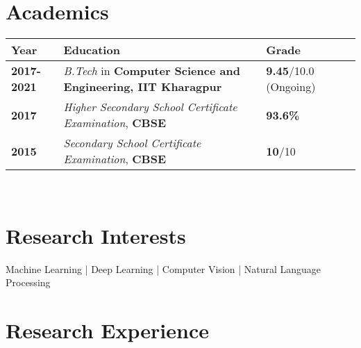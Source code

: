 \documentclass[a4paper,10pt]{extarticle} %
\begin{document}
\vspace{-0.6cm}
\section{\textcolor{primary}{Academics}}

\indent \begin{tabular}{ l @{\hskip 1cm} l @{\hskip 2.5cm} l @{\hskip 1.8cm} l }
\textbf{Year} & \textbf{Education} & \textbf{Grade}\\
\hline
\textbf{2017-2021} & \textit{B.Tech} in \textbf{Computer Science and Engineering, IIT Kharagpur} & \textbf{9.45}/10.0 (Ongoing) \\
\textbf{2017} & \textit{Higher Secondary School Certificate Examination}, \textbf{CBSE} & \textbf{93.6\%} \\
\textbf{2015} & \textit{Secondary School Certificate Examination}, \textbf{CBSE} & \textbf{10}/10\\
\end{tabular} \\


\vspace{-0.3cm}
\section{\textcolor{primary}{Research Interests}}

\noindent Machine Learning | Deep Learning | Computer Vision | Natural Language Processing %




\section{\textcolor{primary}{Research Experience}}
\end{document}
